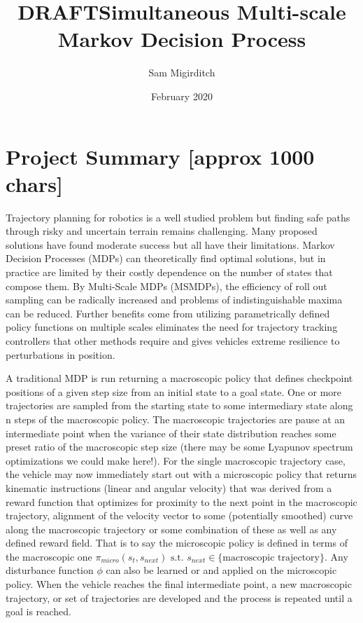 \documentclass[12pt]{article}
\title{\textbf{DRAFT}\linebreak Simultaneous Multi-scale Markov Decision Process}
\author{Sam Migirditch}
\date{February 2020}
\begin{document}
\maketitle

\section{Project Summary [approx 1000 chars]}

Trajectory planning for robotics is a well studied problem but finding safe paths through risky and uncertain terrain remains challenging. Many proposed solutions have found moderate success but all have their limitations. Markov Decision Processes (MDPs) can theoretically find optimal solutions, but in practice are limited by their costly dependence on the number of states that compose them. By Multi-Scale MDPs (MSMDPs), the efficiency of roll out sampling can be radically increased and problems of indistinguishable maxima can be reduced. Further benefits come from utilizing parametrically defined policy functions on multiple scales eliminates the need for trajectory tracking controllers that other methods require and gives vehicles extreme resilience to perturbations in position. 

A traditional MDP is run returning a macroscopic policy that defines checkpoint positions of a given step size from an initial state to a goal state. One or more trajectories are sampled from the starting state to some intermediary state along n steps of the macroscopic policy. The macroscopic trajectories are pause at an intermediate point when the variance of their state distribution reaches some preset ratio of the macroscopic step size (there may be some Lyapunov spectrum optimizations we could make here!). For the single macroscopic trajectory case, the vehicle may now immediately start out with a microscopic policy that returns kinematic instructions (linear and angular velocity) that was derived from a reward function that optimizes for proximity to the next point in the  macroscopic trajectory, alignment of the velocity vector to some (potentially smoothed) curve along the macroscopic trajectory or some combination of these as well as any defined reward field. That is to say the microscopic policy is defined in terms of the macroscopic one $\pi_{micro}(s_t,s_{next}) \textrm{ s.t. } s_{next} \in \{\textrm{macroscopic trajectory}\}$. Any disturbance function $\phi$ can also be learned or and applied on the microscopic policy.   When the vehicle reaches the final intermediate point, a new macroscopic trajectory, or set of trajectories are developed and the process is repeated until a goal is reached. 
\end{document}
